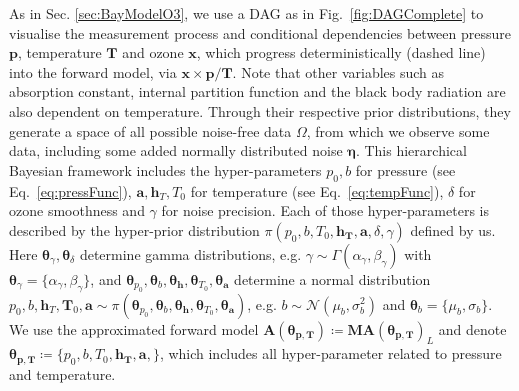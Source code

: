 As in Sec. \ref{sec:BayModelO3}, we use a DAG as in Fig.~\ref{fig:DAGComplete} to visualise the measurement process and conditional dependencies between pressure $\bm{p}$, temperature $\bm{T}$ and ozone $\bm{x}$, which progress deterministically (dashed line) into the forward model, via $\bm{x} \times \bm{p} / \bm{T}$.
Note that other variables such as absorption constant, internal partition function and the black body radiation are also dependent on temperature.
Through their respective prior distributions, they generate a space of all possible noise-free data $\Omega$, from which we observe some data, including some added normally distributed noise $\bm{\eta}$.
This hierarchical Bayesian framework includes the hyper-parameters $p_0, b $ for pressure (see Eq.~\ref{eq:pressFunc}), $\bm{a}, \bm{h}_T, T_0$ for temperature (see Eq.~\ref{eq:tempFunc}), $\delta$ for ozone smoothness and $\gamma$ for noise precision.
Each of those hyper-parameters is described by the hyper-prior distribution $\pi(p_0,b,T_0,\bm{h_T},\bm{a}, \delta,\gamma)$ defined by us.
Here $\bm{\theta}_{\gamma}, \bm{\theta}_{\delta}$ determine gamma distributions, e.g. $\gamma \sim \Gamma(\alpha_{\gamma},\beta_{\gamma}) $ with $\bm{\theta}_{\gamma} = \{\alpha_{\gamma},\beta_{\gamma} \}$, and $\bm{\theta}_{p_0},\bm{\theta}_{b},\bm{\theta}_{\bm{h}},\bm{\theta}_{T_0},\bm{\theta}_{\bm{a}}$ determine a normal distribution $p_0, b, \bm{h}_T, \bm{T}_0, \bm{a} \sim \pi( \bm{\theta}_{p_0},\bm{\theta}_{b},\bm{\theta}_{\bm{h}},\bm{\theta}_{T_0},\bm{\theta}_{\bm{a}})$, e.g. $b \sim \mathcal{N}(\mu_b, \sigma^2_b)$ and $\bm{\theta}_{b} = \{\mu_b, \sigma_b\}$.
We use the approximated forward model $\bm{A}(\bm{\theta}_{\bm{p}, \bm{T}}) \coloneqq \bm{M}\bm{A}(\bm{\theta}_{\bm{p}, \bm{T}})_L$ and denote $\bm{\theta}_{\bm{p}, \bm{T}}  \coloneqq \{p_0,b,T_0,\bm{h_T},\bm{a} , \}$, which includes all hyper-parameter related to pressure and temperature.
